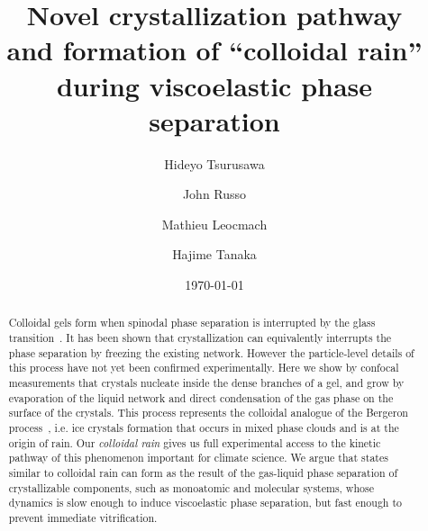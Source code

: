 \documentclass[twocolumn,showpacs,amsmath,amssymb,pre,superscriptaddress]{revtex4}
\begin{document}
\title{Novel crystallization pathway\\and formation of ``colloidal rain'' during viscoelastic phase separation}
\author{Hideyo Tsurusawa}
\author{John Russo}
\author{Mathieu Leocmach}
\author{Hajime Tanaka}


\date{\today}

\begin{abstract}
{
Colloidal gels form when spinodal phase separation is interrupted by the glass transition~\cite{lu2008gelation}. It has been shown that crystallization can equivalently interrupts the phase separation by freezing the existing network. However the particle-level details of this process have not yet been confirmed experimentally.
Here we show by confocal measurements that crystals nucleate inside the dense branches of a gel, and grow by evaporation of the liquid network and direct condensation of the gas phase on the surface of the crystals. This process represents the colloidal analogue of the Bergeron process~\cite{glickman2000glossary}, i.e. ice crystals formation that occurs in mixed phase clouds and is at the origin of rain. Our \emph{colloidal rain} gives us full experimental access to the kinetic pathway of this phenomenon important for climate science.
We argue that states similar to colloidal rain can form as the result of the gas-liquid phase separation of crystallizable components, such as monoatomic and molecular systems, whose dynamics is slow enough to induce viscoelastic phase separation, but fast enough to prevent immediate vitrification.
}
\end{abstract}
 
\end{document}
